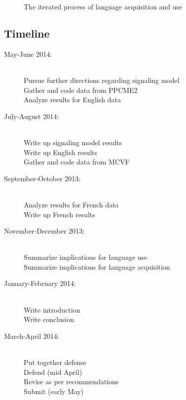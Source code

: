 \documentclass[12pt]{article}
\theoremstyle{definition} \newtheorem{definition}{Definition}
\begin{document}
\begin{figure}
\begin{center}
\end{center}
\caption{The iterated process of language acquisition and use}
\label{second}
\end{figure}



\subsection*{Timeline}

\begin{description}
	\item[May-June 2014:] \hfill \\ Pursue further directions regarding signaling model \\  Gather and code data from PPCME2 \\ Analyze results for English data
        \item[July-August 2014:] \hfill \\ Write up signaling model results \\ Write up English results \\ Gather and code data from MCVF
	\item[September-October 2013:] \hfill\\
	Analyze results for French data \\ Write up French results
	\item[November-December 2013:] \hfill\\ Summarize implications for language use \\ Summarize implications for language acquisition 
	\item[January-February 2014:] \hfill\\ Write introduction \\ Write conclusion
	\item[March-April 2014:] \hfill\\ Put together defense \\ Defend (mid April)  \\ Revise as per recommendations \\ Submit (early May)
\end{description}
\end{document}
